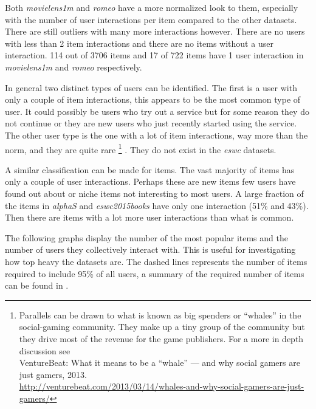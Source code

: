 \newpage



Both \textit{movielens1m} and \textit{romeo} have a more normalized look to them, especially with the number of user interactions per item compared to the other datasets. There are still outliers with many more interactions however. There are no users with less than 2 item interactions and there are no items without a user interaction. 114 out of 3706 items and 17 of 722 items have 1 user interaction in \textit{movielens1m} and \textit{romeo} respectively.

\FloatBarrier

In general two distinct types of users can be identified. The first is a user with only a couple of item interactions, this appears to be the most common type of user. It could possibly be users who try out a service but for some reason they do not continue or they are new users who just recently started using the service. The other user type is the one with a lot of item interactions, way more than the norm, and they are quite rare
\footnote{Parallels can be drawn to what is known as big spenders or ``whales'' in the social-gaming community. They make up a tiny group of the community but they drive most of the revenue for the game publishers. For a more in depth discussion see \\
VentureBeat: What it means to be a ``whale'' — and why social gamers are just gamers, 2013. \\
\url{http://venturebeat.com/2013/03/14/whales-and-why-social-gamers-are-just-gamers/} }
. They do not exist in the \textit{eswc} datasets.

A similar classification can be made for items. The vast majority of items has only a couple of user interactions. Perhaps these are new items few users have found out about or niche items not interesting to most users. 
A large fraction of the items in \textit{alphaS} and \textit{eswc2015books} have only one interaction (51\% and 43\%).  Then there are items with a lot more user interactions than what is common.

The following graphs display the number of the most popular items and the number of users they collectively interact with. This is useful for investigating how top heavy the datasets are. The dashed lines represents the number of items required to include 95\% of all users, a summary of the required number of items can be found in .

